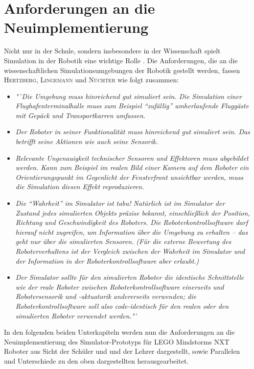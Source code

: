 \documentclass[paper=a4, pagesize, DIV=calc, BCOR=12.5mm, twoside=on, onecolumn=on, open = any, titlepage =on, parskip =half-, headsepline = on, footsepline = on, chapterprefix = on, appendixprefix = off, fontsize = 12pt, numbers = noenddot, abstract = on]{scrbook}
\numberwithin{equation}{chapter}
\theoremstyle{definition}
\theoremstyle{plain}
\theoremstyle{plain}
\theoremstyle{remark}
\theoremstyle{plain}
\theoremstyle{plain}
\begin{document}
\chapter{Anforderungen an die Neuimplementierung}
\label{chap:anforderungen}
\onehalfspacing
Nicht nur in der Schule, sondern insbesondere in der Wissenschaft spielt Simulation in der Robotik eine wichtige Rolle \cite[S.13]{hertzberg:12}. Die Anforderungen, die an die wissenschaftlichen Simulationsumgebungen der Robotik gestellt werden, fassen \textsc{Hertzberg, Lingemann} und \textsc{Nüchter} wie folgt zusammen:
\begin{itemize}
\item \emph{"`Die Umgebung muss hinreichend gut simuliert sein. Die Simulation einer Flughafenterminalhalle muss zum Beispiel "`zufällig"' umherlaufende Fluggäste mit Gepäck und Transportkarren umfassen.}
\item \emph{Der Roboter in seiner Funktionalität muss hinreichend gut simuliert sein. Das betrifft seine Aktionen wie auch seine Sensorik.}
\item\emph{Relevante Ungenauigkeit technischer Sensoren und Effektoren muss abgebildet werden. Kann zum Beispiel im realen Bild einer Kamera auf dem Roboter ein Orientierungspunkt im Gegenlicht der Fensterfront unsichtbar werden, muss die Simulation diesen Effekt reproduzieren.}
\item \emph{Die "`Wahrheit"' im Simulator ist tabu! Natürlich ist im Simulator der Zustand jedes simulierten Objekts präzise bekannt, einschließlich der Position, Richtung und Geschwindigkeit des Roboters. Die Roboterkontrollsoftware darf hierauf nicht zugreifen, um Information über die Umgebung zu erhalten -- das geht nur über die simulierten Sensoren. (Für die externe Bewertung des Roboterverhaltens ist der Vergleich zwischen der Wahrheit im Simulator und der Information in der Roboterkontrollsoftware aber erlaubt.)}
\item \emph{Der Simulator sollte für den simulierten Roboter die identische Schnittstelle wie der reale Roboter zwischen Roboterkontrollsoftware einerseits und Robotersensorik und -aktuatorik andererseits verwenden; die Roboterkontrollsoftware soll also code-identisch für den realen oder den simulierten Roboter verwendet werden."'} \cite[S.14]{hertzberg:12}
\end{itemize}

In den folgenden beiden Unterkapiteln werden nun die Anforderungen an die Neuimplementierung des Simulator-Prototyps für LEGO Mindstorms NXT Roboter aus Sicht der Schüler und und der Lehrer dargestellt, sowie Parallelen und Unterschiede zu den oben dargestellten herausgearbeitet.
\end{document}
